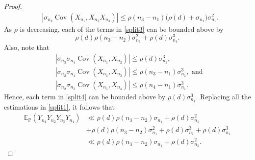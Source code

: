 \documentclass[10pt,a4paper]{amsart}
\newcommand{\Cov}{\operatorname{Cov}}
\begin{document}
\begin{proof}
\begin{equation}
\begin{split}
    &|\sigma_{n_2}\Cov(X_{n_1},X_{n_3}X_{n_4})|\leq \rho(n_3-n_1)\Big(\rho(d)+\sigma_{n_1}\Big)\sigma_{n_1}^2.\label{split3} 
\end{split}
\end{equation}
As $\rho$ is decreasing, each of the terms in \eqref{split3} can be bounded above by $$\rho(d)\rho(n_3-n_2)\sigma_{n_1}^2+\rho(d)\sigma_{n_1}^3.$$
Also, note that
\begin{equation}
\begin{split}
    &|\sigma_{n_3}\sigma_{n_4}\Cov(X_{n_1},X_{n_2})|\leq \rho(d)\sigma_{n_1}^3,\\
    &|\sigma_{n_2}\sigma_{n_4}\Cov(X_{n_1},X_{n_3})|\leq \rho(n_3-n_1)\sigma_{n_1}^3,\text{ and }\\
    &|\sigma_{n_2}\sigma_{n_3}\Cov(X_{n_1},X_{n_4})|\leq \rho(n_4-n_1)\sigma_{n_1}^3. \label{split4} 
\end{split}
\end{equation}
Hence, each term in \eqref{split4} can be bounded above by $\rho(d)\sigma_{n_1}^3.$
Replacing all the estimations in \eqref{split1}, it follows that
\begin{align*}
    \mathbb{E}_{\mathbb{P}}\left( Y_{n_1} Y_{n_2} Y_{n_3} Y_{n_4} \right)&\ll \rho(d)\rho(n_3-n_2)\sigma_{n_1}+\rho(d)\sigma_{n_1}^2\\
    &+\rho(d)\rho(n_3-n_2)\sigma_{n_1}^2+\rho(d)\sigma_{n_1}^3+\rho(d)\sigma_{n_1}^3\\
    &\ll \rho(d)\rho(n_3-n_2)\sigma_{n_1}+\rho(d)\sigma_{n_1}^2.
\end{align*}\end{proof}
\end{document}
